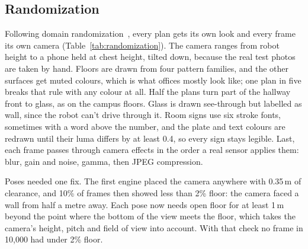 \documentclass[conference]{IEEEtran}
\begin{document}
\subsection{Randomization}

Following domain randomization~\cite{tobin2017domain}, every plan gets its own
look and every frame its own camera (Table~\ref{tab:randomization}). The
camera ranges from robot height to a phone held at chest height, tilted down,
because the real test photos are taken by hand. Floors are drawn from four
pattern families, and the other surfaces get muted colours, which is what
offices mostly look like; one plan in five breaks that rule with any colour
at all. Half the plans turn part of the hallway front to glass, as on the
campus floors. Glass is drawn see-through but labelled as wall, since the
robot can't drive through it. Room signs use six stroke fonts, sometimes with
a word above the number, and the plate and text colours are redrawn until
their luma differs by at least 0.4, so every sign stays legible. Last, each
frame passes through camera effects in the order a real sensor applies them:
blur, gain and noise, gamma, then JPEG compression.

Poses needed one fix. The first engine placed the camera anywhere with
0.35\,m of clearance, and 10\% of frames then showed less than 2\% floor: the
camera faced a wall from half a metre away. Each pose now needs open floor
for at least 1\,m beyond the point where the bottom of the view meets the
floor, which takes the camera's height, pitch and field of view into
account. With that check no frame in 10{,}000 had under 2\% floor.
\end{document}
